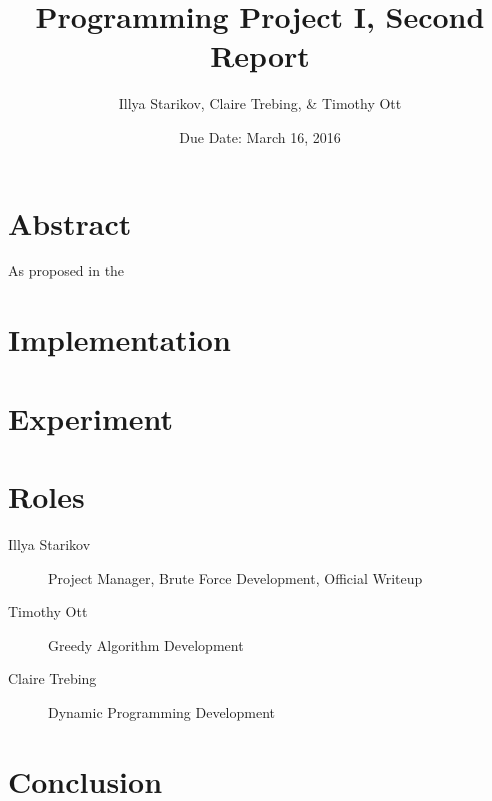 \documentclass{article}
\title{Programming Project I, Second Report}
\author{Illya Starikov, Claire Trebing, \& Timothy Ott}
\date{Due Date: March 16, 2016}
\begin{document}
\maketitle

\section{Abstract}
As proposed in the

\section{Implementation}
\section{Experiment}
\section{Roles}
\begin{description}
    \item [Illya Starikov] Project Manager, Brute Force Development, Official Writeup
    \item [Timothy Ott] Greedy Algorithm Development
    \item [Claire Trebing] Dynamic Programming Development
\end{description}

\section{Conclusion}
\end{document}
